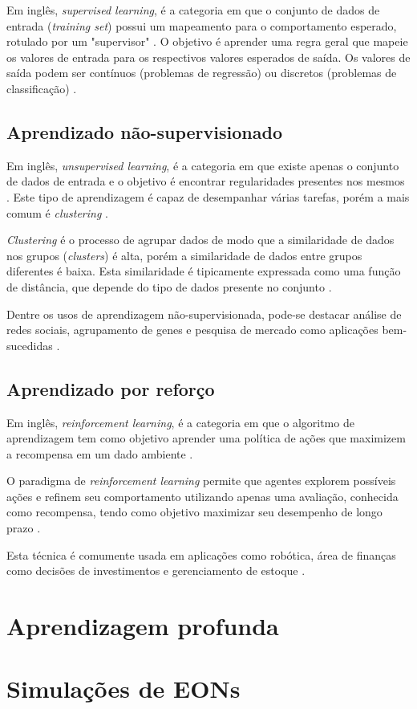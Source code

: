 Em inglês, \textit{supervised learning}, é a categoria em que o conjunto de dados de entrada (\textit{training set}) possui um mapeamento para o comportamento esperado, rotulado por um "supervisor" \cite{alpaydin2020introduction}. O objetivo é aprender uma regra geral que mapeie os valores de entrada para os respectivos valores esperados de saída. Os valores de saída podem ser contínuos (problemas de regressão) ou discretos (problemas de classificação) \cite{8527529}.

\subsection{Aprendizado não-supervisionado}

Em inglês, \textit{unsupervised learning}, é a categoria em que existe apenas o conjunto de dados de entrada e o objetivo é encontrar regularidades presentes nos mesmos \cite{alpaydin2020introduction}. Este tipo de aprendizagem é capaz de desempanhar várias tarefas, porém a mais comum é \textit{clustering} \cite{8527529}.

\textit{Clustering} é o processo de agrupar dados de modo que a similaridade de dados nos grupos (\textit{clusters}) é alta, porém a similaridade de dados entre grupos diferentes é baixa. Esta similaridade é tipicamente expressada como uma função de distância, que depende do tipo de dados presente no conjunto \cite{8527529}.

Dentre os usos de aprendizagem não-supervisionada, pode-se destacar análise de redes sociais, agrupamento de genes e pesquisa de mercado como aplicações bem-sucedidas \cite{8527529}.

\subsection{Aprendizado por reforço}

Em inglês, \textit{reinforcement learning}, é a categoria em que o algoritmo de aprendizagem tem como objetivo aprender uma política de ações que maximizem a recompensa em um dado ambiente \cite{alpaydin2020introduction}.

O paradigma de \textit{reinforcement learning} permite que agentes explorem possíveis ações e refinem seu comportamento utilizando apenas uma avaliação, conhecida como recompensa, tendo como objetivo maximizar seu desempenho de longo prazo \cite{8527529}.

Esta técnica é comumente usada em aplicações como robótica, área de finanças como decisões de investimentos e gerenciamento de estoque \cite{8527529}.

\section{Aprendizagem profunda}

\section{Simulações de EONs}%
\label{ft_eon}
